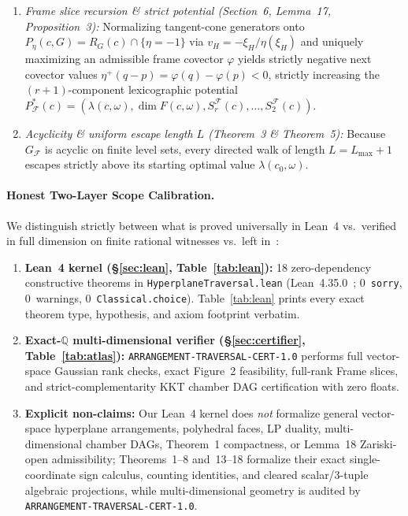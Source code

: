 \documentclass[10pt,twocolumn]{article}
\newcommand{\QQ}{\mathbb{Q}}
\begin{document}
\begin{enumerate}[leftmargin=1.2em,itemsep=1pt,topsep=2pt]
  \item \emph{Frame slice recursion \& strict potential (Section~6, Lemma~17, Proposition~3):} Normalizing tangent-cone generators onto $P_\eta(c,G) = R_G(c) \cap \{\eta = -1\}$ via $v_H = -\xi_H/\eta(\xi_H)$ and uniquely maximizing an admissible frame covector $\varphi$ yields strictly negative next covector values $\eta^+(q-p) = \varphi(q)-\varphi(p) < 0$, strictly increasing the $(r+1)$-component lexicographic potential $P^*_{\mathcal{F}}(c) = (\lambda(c,\omega), \dim F(c,\omega), S^{\mathcal{F}}_r(c),\dots, S^{\mathcal{F}}_2(c))$.
  \item \emph{Acyclicity \& uniform escape length $L$ (Theorem~3 \& Theorem~5):} Because $G_{\mathcal{F}}$ is acyclic on finite level sets, every directed walk of length $L = L_{\max} + 1$ escapes strictly above its starting optimal value $\lambda(c_0, \omega)$.
\end{enumerate}

\paragraph{Honest Two-Layer Scope Calibration.}
We distinguish strictly between what is proved universally in Lean~4 vs.\ verified in full dimension on finite rational witnesses vs.\ left in~\cite{dury2026traversing}:
\begin{enumerate}[leftmargin=1.2em,itemsep=1pt,topsep=2pt]
  \item \textbf{Lean~4 kernel (\S\ref{sec:lean}, Table~\ref{tab:lean}):} 18 zero-dependency constructive theorems in \texttt{HyperplaneTraversal.lean} (Lean~4.35.0~\cite{demoura2021lean4}; 0~\texttt{sorry}, 0~warnings, 0~\texttt{Classical.choice}). Table~\ref{tab:lean} prints every exact theorem type, hypothesis, and axiom footprint verbatim.
  \item \textbf{Exact-$\QQ$ multi-dimensional verifier (\S\ref{sec:certifier}, Table~\ref{tab:atlas}):} \texttt{ARRANGEMENT-TRAVERSAL-CERT-1.0} performs full vector-space Gaussian rank checks, exact Figure~2 feasibility, full-rank Frame slices, and strict-complementarity KKT chamber DAG certification with zero floats.
  \item \textbf{Explicit non-claims:} Our Lean~4 kernel does \emph{not} formalize general vector-space hyperplane arrangements, polyhedral faces, LP duality, multi-dimensional chamber DAGs, Theorem~1 compactness, or Lemma~18 Zariski-open admissibility; Theorems~1--8 and~13--18 formalize their exact single-coordinate sign calculus, counting identities, and cleared scalar/3-tuple algebraic projections, while multi-dimensional geometry is audited by \texttt{ARRANGEMENT-TRAVERSAL-CERT-1.0}.
\end{enumerate}
\end{document}
